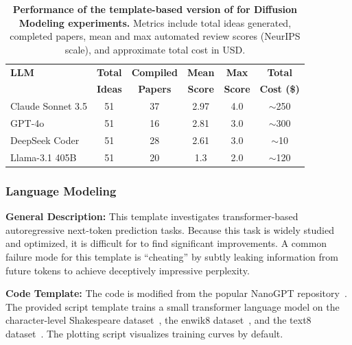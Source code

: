 \begin{appendices}
\begin{table}[!h]
\centering
\caption{\textbf{Performance of the template-based version of \ouralgo for Diffusion Modeling experiments.} Metrics include total ideas generated, completed papers, mean and max automated review scores (NeurIPS scale), and approximate total cost in USD.}
\label{tab:app_diff_papers}

\begin{tabular}{@{}l|c|c|c|c|c@{}}
\toprule
\textbf{LLM} & \textbf{Total} & \textbf{Compiled} & \textbf{Mean} & \textbf{Max} & \textbf{Total} \\
 & \textbf{Ideas} & \textbf{Papers} & \textbf{Score} & \textbf{Score} & \textbf{Cost (\$)} \\ \midrule
Claude Sonnet 3.5     & 51 & 37 & 2.97 & 4.0 & $\sim$250 \\
GPT-4o         & 51 &  16 & 2.81 & 3.0 & $\sim$300 \\
DeepSeek Coder & 51 &  28 & 2.61 & 3.0 & $\sim$10   \\
Llama-3.1 405B & 51 &  20 & 1.3 & 2.0 & $\sim$120 \\
\bottomrule
\end{tabular}

\end{table}


\subsubsection*{Language Modeling}
\textbf{General Description:} This template investigates transformer-based~\citep{vaswani2017attention} autoregressive next-token prediction tasks. Because this task is widely studied and optimized, it is difficult for \ouralgo to find significant improvements. A common failure mode for this template is ``cheating'' by subtly leaking information from future tokens to achieve deceptively impressive perplexity.

\textbf{Code Template:} The code is modified from the popular NanoGPT repository~\citep{karpathy2022nanogpt}. The provided script template trains a small transformer language model on the character-level Shakespeare dataset~\citep{char_shakespeare}, the enwik8 dataset~\citep{hutter_prize}, and the text8 dataset~\citep{text8}. The plotting script visualizes training curves by default.


\begin{table}[!h]
\centering
\caption{\textbf{Performance of the template-based version of \ouralgo for Language Modeling experiments.} Metrics as in .}
\label{tab:app_nlp_papers}


\end{table}
\end{appendices}
